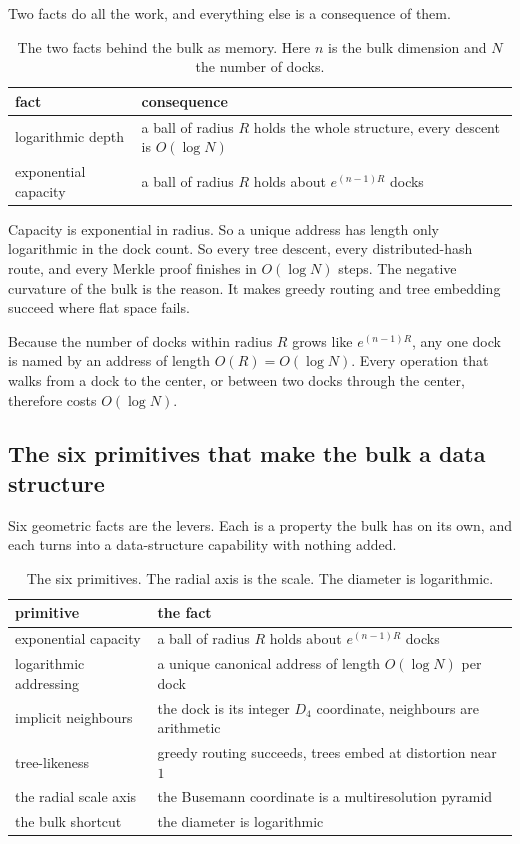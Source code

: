 Two facts do all the work, and everything else is a consequence of them.

\begin{table}[ht]
\centering
\begin{tabular}{@{}ll@{}}
\toprule
fact & consequence \\
\midrule
logarithmic depth & a ball of radius $R$ holds the whole structure, every descent is $O(\log N)$ \\
exponential capacity & a ball of radius $R$ holds about $e^{(n-1)R}$ docks \\
\bottomrule
\end{tabular}
\caption{The two facts behind the bulk as memory. Here $n$ is the bulk dimension and $N$ the number of docks.}
\label{tab:two-facts}
\end{table}

Capacity is exponential in radius. So a unique address has length only logarithmic in the dock count. So every tree descent, every distributed-hash route, and every Merkle proof finishes in $O(\log N)$ steps. The negative curvature of the bulk is the reason. It makes greedy routing and tree embedding succeed where flat space fails.

\begin{principle}
Because the number of docks within radius $R$ grows like $e^{(n-1)R}$, any one dock is named by an address of length $O(R) = O(\log N)$. Every operation that walks from a dock to the center, or between two docks through the center, therefore costs $O(\log N)$.
\end{principle}

\subsection{The six primitives that make the bulk a data structure}

Six geometric facts are the levers. Each is a property the bulk has on its own, and each turns into a data-structure capability with nothing added.

\begin{table}[ht]
\centering
\begin{tabular}{@{}ll@{}}
\toprule
primitive & the fact \\
\midrule
exponential capacity & a ball of radius $R$ holds about $e^{(n-1)R}$ docks \\
logarithmic addressing & a unique canonical address of length $O(\log N)$ per dock \\
implicit neighbours & the dock is its integer $D_4$ coordinate, neighbours are arithmetic \\
tree-likeness & greedy routing succeeds, trees embed at distortion near $1$ \\
the radial scale axis & the Busemann coordinate is a multiresolution pyramid \\
the bulk shortcut & the diameter is logarithmic \\
\bottomrule
\end{tabular}
\caption{The six primitives. The radial axis is the scale. The diameter is logarithmic.}
\label{tab:six-primitives}
\end{table}

